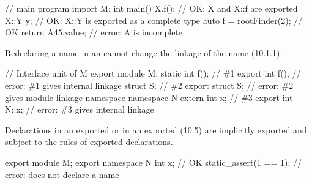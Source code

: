 \begin{std.txt}
\begin{example}
\begin{codeblock}
      // main program
      import M;
      int main() {
        X{}.f();                // OK: X and X::f are exported
        X::Y y;                 // OK: X::Y is exported as a complete type
        auto f = rootFinder(2); // OK
        return A{45}.value;     // error: A is incomplete
      }
      \end{codeblock}
  \end{example}


  
  \alinea
  \enternote
  Redeclaring a name in an 
  cannot change the linkage of the name (10.1.1).
  \begin{example}
  \begin{codeblock}
    // Interface unit of M
    export module M;
    static int f();             // \#1
    export int f();             // error: \#1 gives internal linkage
    struct S;                   // \#2
    export struct S;            // error: \#2 gives module linkage
    namespace {
      namespace N {
        extern int x;           // \#3
      }
    }
    export int N::x;            // error: \#3 gives internal linkage
  \end{codeblock}
  \end{example}
  \exitnote


  \alinea
  Declarations in an exported  
  or in an exported  (10.5)
  are
  implicitly exported and subject to the rules of exported declarations.
  \begin{example}
    \begin{codeblock}
    export module M;
    export namespace N {
      int x;                    // OK
      static_assert(1 == 1);    // error: does not declare a name
    }
    \end{codeblock}
  \end{example}
\end{std.txt}


